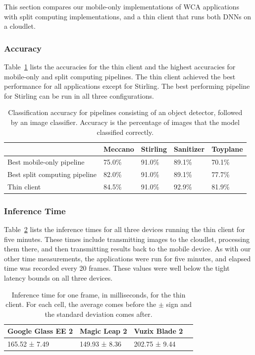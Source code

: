This section compares our mobile-only implementations of WCA applications with
split computing implementations, and a thin client that runs both DNNs on a
cloudlet.

\subsubsection{Accuracy}

Table~\ref{tab:thin_accuracy} lists the accuracies for the thin client and the
highest accuracies for mobile-only and split computing pipelines.
The thin client achieved the best performance for all applications except for
Stirling.
The best performing pipeline for Stirling can be run in all three
configurations.

\begin{table}
\begin{tabular}{|l||l|l|l|l|}
  \hline
  & Meccano & Stirling & Sanitizer & Toyplane\\
  \hline
  \hline
  Best mobile-only pipeline & 75.0\% & 91.0\% & 89.1\% & 70.1\%\\
  Best split computing pipeline & 82.0\% & 91.0\% & 89.1\% & 77.7\%\\
  Thin client & 84.5\% & 91.0\% & 92.9\% & 81.9\%\\
  \hline
\end{tabular}
  \caption{
    Classification accuracy for pipelines consisting of an object detector,
    followed by an image classifier.
    Accuracy is the percentage of images that the model classified correctly.
  }\label{tab:thin_accuracy}
\end{table}

\subsubsection{Inference Time}

Table~\ref{tab:thin_times} lists the inference times for all three devices running
the thin client for five minutes.
These times include transmitting images to the cloudlet, processing them there,
and then transmitting results back to the mobile device.
As with our other time measurements, the applications were run for five minutes,
and elapsed time was recorded every 20 frames.
These values were well below the tight latency bounds on all three devices.

\begin{table}
\begin{tabular}{|l||l|l|l|}
  \hline
  Google Glass EE 2 & Magic Leap 2 & Vuzix Blade 2\\
  \hline
  \hline
  165.52 ± 7.49 & 149.93 ± 8.36 & 202.75 ± 9.44\\
  \hline
\end{tabular}
  \caption{
    Inference time for one frame, in milliseconds, for the thin client.
    For each cell, the average comes before the $\pm$ sign and the standard
    deviation comes after.
  }\label{tab:thin_times}
\end{table}

